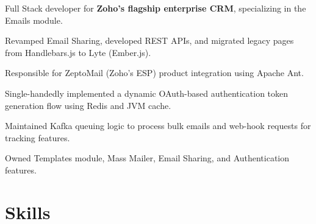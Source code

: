 \documentclass[11pt]{plushcv}
\begin{document}
\sectionsep

\begin{tightemize}
\item Full Stack developer for \textbf{Zoho's flagship enterprise CRM}, specializing in the Emails module.
\item Revamped Email Sharing, developed REST APIs, and migrated legacy pages from Handlebars.js to Lyte (Ember.js). 
\item Responsible for ZeptoMail (Zoho's ESP) product integration using Apache Ant.
\item Single-handedly implemented a dynamic OAuth-based authentication token generation flow using Redis and JVM cache.
\item Maintained Kafka queuing logic to process bulk emails and web-hook requests for tracking features.
\item Owned Templates module, Mass Mailer, Email Sharing, and Authentication features.
\end{tightemize}

\sectionsep


\section{Skills}
\end{document}
